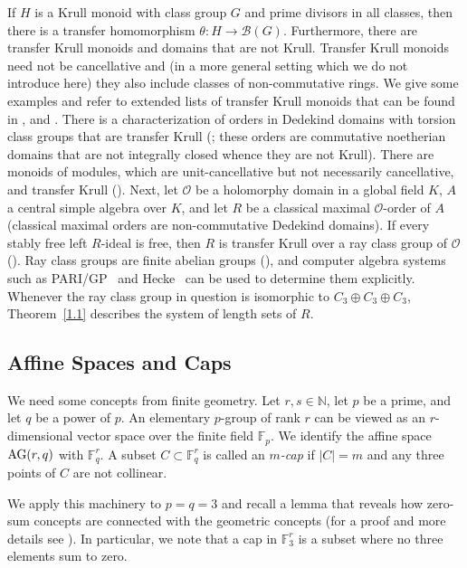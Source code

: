 \documentclass[a4paper, 10pt]{amsart}
\theoremstyle{plain}
\theoremstyle{definition}
\theoremstyle{definition}
\newcommand{\N}{\mathbb N}
\newcommand{\F}{\mathbb F}
\numberwithin{equation}{section}
\begin{document}
\smallskip
If $H$ is a Krull monoid with class group $G$ and prime divisors in all classes, then there is a transfer homomorphism $\theta \colon H \to \mathcal B (G)$. Furthermore, there are  transfer Krull monoids and domains that are not Krull. Transfer Krull monoids need not be cancellative and (in a more general setting which we do not introduce here) they also include classes of non-commutative rings. We  give some  examples and refer to extended lists of transfer Krull monoids that can be found in \cite[Chapter 1]{Ge-Gr-Zh26a}, \cite{Ge-Zh20a} and  \cite{Ba-Re22a}.
There is a characterization of orders in Dedekind domains with torsion class groups that are transfer Krull (\cite{Ra26a}; these orders are commutative noetherian domains that are not integrally closed whence they are not Krull). There are monoids of modules, which are unit-cancellative but not necessarily cancellative, and transfer Krull (\cite{Ba-Sm22a}).
Next, let $\mathcal O$ be a holomorphy domain in a global field $K$, $A$ a central simple algebra over $K$, and let $R$ be a classical maximal $\mathcal O$-order of $A$ (classical maximal orders are non-commutative Dedekind domains). If every stably free left $R$-ideal is free, then $R$ is transfer Krull over a ray class group of $\mathcal O$ (\cite[Theorem 1.1]{Sm13a}).  Ray class groups are finite abelian groups (\cite{HK20a, HK22a}), and computer algebra systems such as PARI/GP~\cite{pari:2.19.1} and Hecke~\cite{Fi-Ha-Ho-Jo17} can be used to determine them explicitly. Whenever the ray class group in question is isomorphic to $C_3 \oplus C_3 \oplus C_3$, Theorem~\ref{1.1} describes the system of length sets of $R$.

\smallskip
\noindent
\subsection{Affine Spaces and Caps} \label{2.5}
We need some concepts from finite geometry. Let $r, s \in \N$, let $p$ be a prime, and let $q$ be a  power of $p$. An elementary $p$-group of rank $r$ can be viewed as an $r$-dimensional vector space over the finite field $\F_p$.
We identify the affine space $\operatorname{AG} (r,q)$ with $\F_q^r$.
A subset $C \subset \F_q^r$ is called an {\it $m$-cap} if $|C|=m$ and any three points of $C$ are not collinear.  

We apply this machinery to $p=q=3$ and recall a lemma that reveals how zero-sum concepts are connected with the geometric concepts (for a proof and more details see \cite[Lemma 5.2]{E-E-G-K-R07}). In particular, we note that a cap in $\F_3^r$ is a subset where no three elements sum to zero. 
\end{document}
